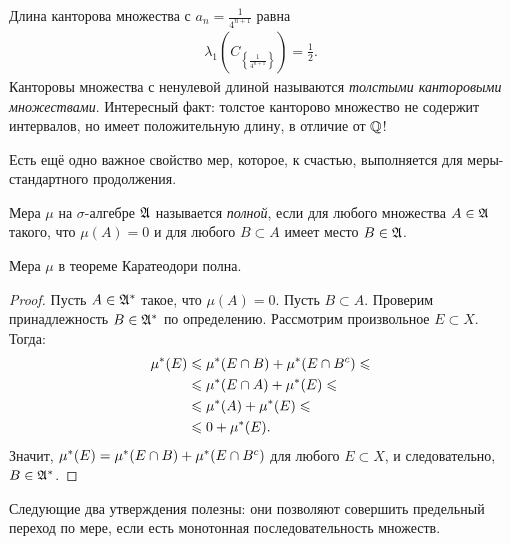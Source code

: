\begin{exmpl}
\begin{enumerate}
Длина канторова множества с $a_n = \frac{1}{4^{n+1}}$ равна
\begin{align*}
 \lambda_1 \left( C_{\left\{ \frac{1}{4^{n+1}} \right\}} \right) = \frac{1}{2}
.\end{align*} Канторовы множества с ненулевой длиной называются \textit{толстыми канторовыми множествами}. Интересный факт: толстое канторово множество не содержит интервалов, но имеет положительную длину, в отличие от $\mathbb{Q}$!
\end{enumerate}
\end{exmpl}

Есть ещё одно важное свойство мер, которое, к счастью, выполняется для меры-стандартного продолжения.

\begin{df}
 Мера $\mu$ на $\sigma$-алгебре $\mathfrak{A}$ называется \textit{полной}, если для любого множества $A \in \mathfrak{A}$ такого, что $\mu(A) = 0$ и для любого  $B \subset A$ имеет место $B \in \mathfrak{A}$.
\end{df}
\begin{remrk}
 Мера $\mu$ в теореме Каратеодори полна.
\end{remrk}
\begin{proof}
 Пусть $A \in \mathfrak{A}^{\ast}$ такое, что $\mu(A) = 0$. Пусть  $B \subset A$. Проверим принадлежность $B \in \mathfrak{A}^{\ast}$ по определению. Рассмотрим произвольное $E \subset X$. Тогда:
 \begin{align*}
  \mu^\ast(E) & \leqslant \mu^\ast(E \cap B) + \mu^\ast(E \cap B^{c}) \leqslant \\
  & \leqslant \mu^\ast(E \cap A) + \mu^\ast(E) \leqslant \\
  & \leqslant \mu^\ast(A) + \mu^\ast(E) \leqslant \\
  & \leqslant 0 + \mu^\ast(E)
 .\end{align*} Значит, $\mu^\ast(E) = \mu^\ast(E \cap B) + \mu^\ast(E \cap B^{c})$ для любого $E \subset X$, и следовательно, $B \in \mathfrak{A}^{\ast}$.
\end{proof}

Следующие два утверждения полезны: они позволяют совершить предельный переход по мере, если есть монотонная последовательность множеств.

